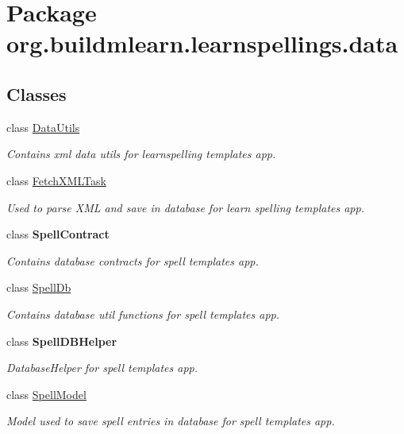 \hypertarget{namespaceorg_1_1buildmlearn_1_1learnspellings_1_1data}{}\section{Package org.\+buildmlearn.\+learnspellings.\+data}
\label{namespaceorg_1_1buildmlearn_1_1learnspellings_1_1data}
\subsection*{Classes}
\begin{DoxyCompactItemize}
\item 
class \hyperlink{classorg_1_1buildmlearn_1_1learnspellings_1_1data_1_1DataUtils}{Data\+Utils}
\begin{DoxyCompactList}\small\item\em Contains xml data utils for learnspelling template\textquotesingle{}s app. \end{DoxyCompactList}\item 
class \hyperlink{classorg_1_1buildmlearn_1_1learnspellings_1_1data_1_1FetchXMLTask}{Fetch\+X\+M\+L\+Task}
\begin{DoxyCompactList}\small\item\em Used to parse X\+ML and save in database for learn spelling template\textquotesingle{}s app. \end{DoxyCompactList}\item 
class {\bfseries Spell\+Contract}
\begin{DoxyCompactList}\small\item\em Contains database contracts for spell template\textquotesingle{}s app. \end{DoxyCompactList}\item 
class \hyperlink{classorg_1_1buildmlearn_1_1learnspellings_1_1data_1_1SpellDb}{Spell\+Db}
\begin{DoxyCompactList}\small\item\em Contains database util functions for spell template\textquotesingle{}s app. \end{DoxyCompactList}\item 
class {\bfseries Spell\+D\+B\+Helper}
\begin{DoxyCompactList}\small\item\em Database\+Helper for spell template\textquotesingle{}s app. \end{DoxyCompactList}\item 
class \hyperlink{classorg_1_1buildmlearn_1_1learnspellings_1_1data_1_1SpellModel}{Spell\+Model}
\begin{DoxyCompactList}\small\item\em Model used to save spell entries in database for spell template\textquotesingle{}s app. \end{DoxyCompactList}\end{DoxyCompactItemize}
